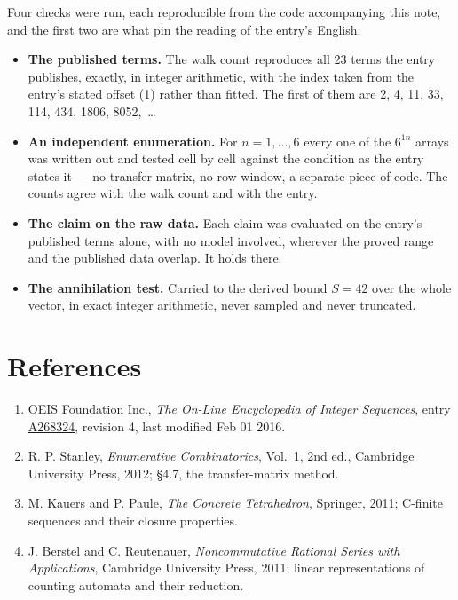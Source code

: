 \documentclass[11pt]{article}
\theoremstyle{definition}
\begin{document}
Four checks were run, each reproducible from the code accompanying this note, and the first two are what pin the reading of the entry's English.

\begin{itemize}

\item {\bfseries The published terms.} The walk count reproduces all 23 terms the entry publishes, exactly, in integer arithmetic, with the index taken from the entry's stated offset (1) rather than fitted. The first of them are 2, 4, 11, 33, 114, 434, 1806, 8052,~\dots

\item {\bfseries An independent enumeration.} For $n = 1,\dots,6$ every one of the $6^{1n}$ arrays was written out and tested cell by cell against the condition as the entry states it --- no transfer matrix, no row window, a separate piece of code. The counts agree with the walk count and with the entry.

\item {\bfseries The claim on the raw data.} Each claim was evaluated on the entry's published terms alone, with no model involved, wherever the proved range and the published data overlap. It holds there.

\item {\bfseries The annihilation test.} Carried to the derived bound $S = 42$ over the whole vector, in exact integer arithmetic, never sampled and never truncated.

\end{itemize}

\section{References}

\begin{enumerate}

\item OEIS Foundation Inc., \emph{The On-Line Encyclopedia of Integer Sequences}, entry \href{https://oeis.org/A268324}{A268324}, revision 4, last modified Feb 01 2016.

\item R. P. Stanley, \emph{Enumerative Combinatorics}, Vol.~1, 2nd ed., Cambridge University Press, 2012; \S4.7, the transfer-matrix method.

\item M. Kauers and P. Paule, \emph{The Concrete Tetrahedron}, Springer, 2011; C-finite sequences and their closure properties.

\item J. Berstel and C. Reutenauer, \emph{Noncommutative Rational Series with Applications}, Cambridge University Press, 2011; linear representations of counting automata and their reduction.

\end{enumerate}
\end{document}
